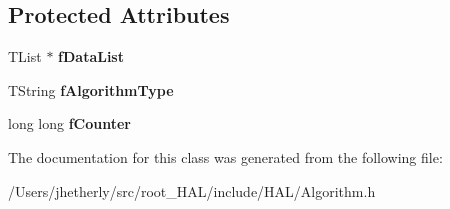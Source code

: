 \subsection*{Protected Attributes}
\begin{DoxyCompactItemize}
\item 
\hypertarget{class_h_a_l_1_1_algorithm_aacc4824bcc223fc86f0f57662393e56c}{T\+List $\ast$ {\bfseries f\+Data\+List}}\label{class_h_a_l_1_1_algorithm_aacc4824bcc223fc86f0f57662393e56c}

\item 
\hypertarget{class_h_a_l_1_1_algorithm_a15bbd1834a2413957b2946e051584d49}{T\+String {\bfseries f\+Algorithm\+Type}}\label{class_h_a_l_1_1_algorithm_a15bbd1834a2413957b2946e051584d49}

\item 
\hypertarget{class_h_a_l_1_1_algorithm_a91a834bebb25ccc2e4324fcaf51bf294}{long long {\bfseries f\+Counter}}\label{class_h_a_l_1_1_algorithm_a91a834bebb25ccc2e4324fcaf51bf294}

\end{DoxyCompactItemize}


The documentation for this class was generated from the following file\+:\begin{DoxyCompactItemize}
\item 
/\+Users/jhetherly/src/root\+\_\+\+H\+A\+L/include/\+H\+A\+L/Algorithm.\+h\end{DoxyCompactItemize}
